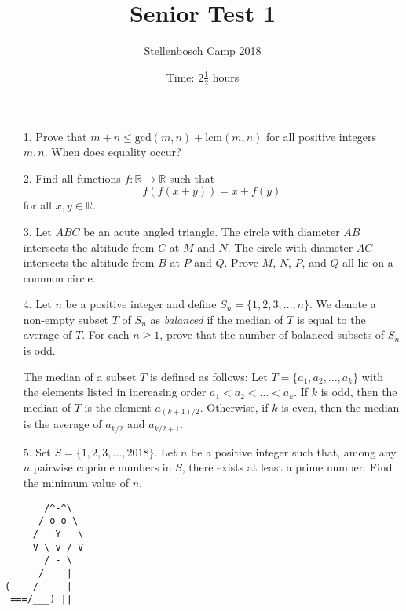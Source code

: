 \documentclass[a4paper, 12pt]{article}
\title{Senior Test 1}
\author{Stellenbosch Camp 2018}
\date{Time: $2 \frac{1}{2}$ hours}
\begin{document}
 \maketitle

\begin{enumerate}

\item[1.] Prove that $m + n \leq \textrm{gcd}(m, n) + \textrm{lcm}(m, n)$ for all positive integers $m, n$. When does equality occur? \\

\item[2.] Find all functions $f : \mathbb{R} \to \mathbb{R}$ such that
$$ f(f(x+y)) = x + f(y) $$
for all $x, y \in \mathbb{R}$. \\

\item[3.] Let $ABC$ be an acute angled triangle. The circle with diameter $AB$ intersects the altitude from $C$ at $M$ and $N$. The circle with diameter $AC$ intersects the altitude from $B$ at $P$ and $Q$. Prove $M$, $N$, $P$, and $Q$ all lie on a common circle. \\



\item[4.] Let $n$ be a positive integer and define $S_n = \{1, 2, 3, \dots, n\}$. We denote a non-empty subset $T$ of $S_n$ as \textit{balanced} if the median of $T$ is equal to the average of $T$. For each $n \geq 1$, prove that the number of balanced subsets of $S_n$ is odd. 

The median of a subset $T$ is defined as follows: Let $T = \{a_1, a_2, \dots, a_k\}$ with the elements listed in increasing order $a_1 < a_2 < \dots < a_k$. If $k$ is odd, then the median of $T$ is the element $a_{(k+1)/2}$. Otherwise, if $k$ is even, then the median is the average of $a_{k/2}$ and $a_{k/2 + 1}$. \\

\item[5.] Set $S = \{1, 2, 3, ..., 2018\}$. Let $n$ be a positive integer such that, among any $n$ pairwise coprime numbers in $S$, there exists at least a prime number. Find the minimum value of $n$.


\end{enumerate}

\vfill

\centering
\begin{BVerbatim}
       /^-^\
      / o o \
     /   Y   \
     V \ v / V
       / - \
      /    |
(    /     |
 ===/___) ||
\end{BVerbatim}

\vspace{12mm}
\end{document}
